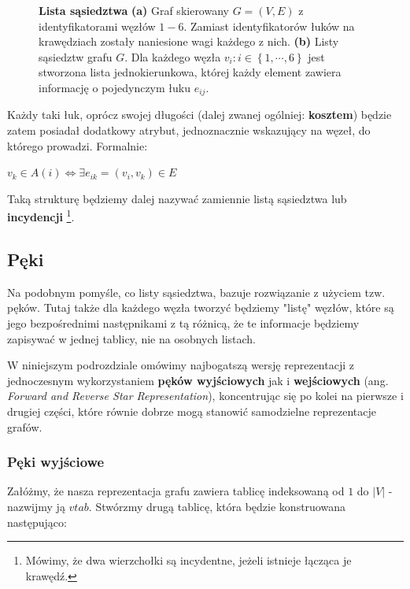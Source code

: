 \begin{figure}[!htbp]
\begin{subfigure}[b]{0.33\textwidth}
		\caption{}
	\end{subfigure}
	\caption{\textbf{Lista sąsiedztwa} \textbf{(a)} Graf skierowany $G = \left( V, E \right)$ z identyfikatorami węzłów $1-6$. Zamiast identyfikatorów łuków na krawędziach zostały naniesione wagi każdego z nich. \textbf{(b)} Listy sąsiedztw grafu $G$. Dla każdego węzła $v_{i} : i \in \left\{ 1, \cdots, 6 \right\}$ jest stworzona lista jednokierunkowa, której każdy element zawiera informację o pojedynczym łuku $e_{ij}$.}\label{fig:adjacencyList}
\end{figure}

Każdy taki łuk, oprócz swojej długości (dalej zwanej ogólniej: \textbf{kosztem}) będzie zatem posiadał dodatkowy atrybut, jednoznacznie wskazujący na węzeł, do którego prowadzi. Formalnie:

$v_{k} \in A \left ( i \right ) \Leftrightarrow \exists e_{ik} = \left( v_{i}, v_{k} \right) \in E $

Taką strukturę będziemy dalej nazywać zamiennie listą sąsiedztwa lub \textbf{incydencji} \footnote{Mówimy, że dwa wierzchołki są incydentne, jeżeli istnieje łącząca je krawędź.}.

\subsection{Pęki}

Na podobnym pomyśle, co listy sąsiedztwa, bazuje rozwiązanie z użyciem tzw. pęków. Tutaj także dla każdego węzła tworzyć będziemy "listę" węzłów, które są jego bezpośrednimi następnikami z tą różnicą, że te informacje będziemy zapisywać w jednej tablicy, nie na osobnych listach.

W niniejszym podrozdziale omówimy najbogatszą wersję reprezentacji z jednoczesnym wykorzystaniem \textbf{pęków wyjściowych} jak i \textbf{ wejściowych} (ang. \textit{Forward and Reverse Star Representation}), koncentrując się po kolei na pierwsze i drugiej części, które równie dobrze mogą stanowić samodzielne reprezentacje grafów.

\subsubsection{Pęki wyjściowe}

Załóżmy, że nasza reprezentacja grafu zawiera tablicę indeksowaną od $1$ do $ \left| V \right| $ - nazwijmy ją $vtab$. Stwórzmy drugą tablicę, która będzie konstruowana następująco:

